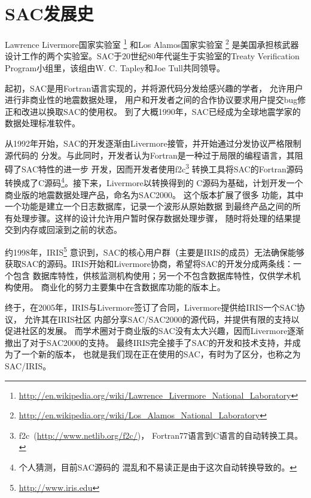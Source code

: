 \section{SAC发展史}
\label{sec:history}

Lawrence Livermore国家实验室
\footnote{\url{http://en.wikipedia.org/wiki/Lawrence\_Livermore\_National\_Laboratory}}
和Los Alamos国家实验室
\footnote{\url{http://en.wikipedia.org/wiki/Los\_Alamos\_National\_Laboratory}}
是美国承担核武器设计工作的两个实验室。SAC于20世纪80年代诞生于实验室的Treaty Verification Program小组里，该组由W. C. Tapley和Joe Tull共同领导。

起初，SAC是用Fortran语言实现的，并将源代码分发给感兴趣的学者，
允许用户进行非商业性的地震数据处理，
用户和开发者之间的合作协议要求用户提交bug修正和改进以换取SAC的使用权。
到了大概1990年，SAC已经成为全球地震学家的数据处理标准软件。

从1992年开始，SAC的开发逐渐由Livermore接管，并开始通过分发协议严格限制源代码的
分发。与此同时，开发者认为Fortran是一种过于局限的编程语言，其阻碍了SAC特性的进一步
开发，因而开发者使用f2c\footnote{f2c~(\url{http://www.netlib.org/f2c/})，
Fortran77语言到C语言的自动转换工具。}
转换工具将SAC的Fortran源码转换成了C源码\footnote{个人猜测，目前SAC源码的
混乱和不易读正是由于这次自动转换导致的。}。接下来，Livermore以转换得到的
C源码为基础，计划开发一个商业版的地震数据处理产品，命名为SAC2000。
这个版本扩展了很多
功能，其中一个功能是建立一个日志数据库，记录一个波形从原始数据
到最终产品之间的所有处理步骤。这样的设计允许用户暂时保存数据处理步骤，
随时将处理的结果提交到内存或回滚到之前的状态。

约1998年，IRIS\footnote{\url{http://www.iris.edu}}
意识到，SAC的核心用户群（主要是IRIS的成员）无法确保能够
获取SAC的源码。IRIS开始和Livermore协商，希望将SAC的开发分成两条线：一个包含
数据库特性，供核监测机构使用；另一个不包含数据库特性，仅供学术机构使用。
商业化的努力主要集中在含数据库功能的版本上。

终于，在2005年，IRIS与Livermore签订了合同，Livermore提供给IRIS一个SAC协议，
允许其在IRIS社区
内部分享SAC/SAC2000的源代码，并提供有限的支持以促进社区的发展。
而学术圈对于商业版的SAC没有太大兴趣，因而Livermore逐渐撤出了对于SAC2000的支持。
最终IRIS完全接手了SAC的开发和技术支持，并成为了一个新的版本，
也就是我们现在正在使用的SAC，有时为了区分，也称之为SAC/IRIS。
